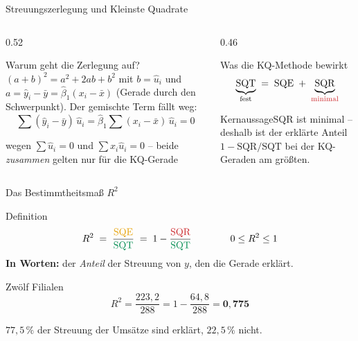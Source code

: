 \documentclass[aspectratio=169,11pt]{beamer}
\newcommand{\kernaussage}[1]{\begin{alertblock}{Kernaussage}#1\end{alertblock}}
\begin{document}
\begin{frame}{Streuungszerlegung und Kleinste Quadrate}
  \begin{columns}[T]
    \begin{column}{0.52\textwidth}
      \begin{block}{Warum geht die Zerlegung auf?}
        $(a + b)^{2} = a^{2} + 2ab + b^{2}$ mit $b = \hat{u}_i$ und
        $a = \hat{y}_i - \bar{y} = \hat{\beta}_1 (x_i - \bar{x})$
        (Gerade durch den Schwerpunkt). Der gemischte Term fällt weg:
        \[
          \sum (\hat{y}_i - \bar{y})\,\hat{u}_i
          = \hat{\beta}_1 \sum (x_i - \bar{x})\,\hat{u}_i = 0
        \]
        \vspace{-10pt}

        \footnotesize wegen $\sum \hat{u}_i = 0$ und $\sum x_i \hat{u}_i = 0$ --
        beide \emph{zusammen} gelten nur für die KQ-Gerade
      \end{block}
    \end{column}
    \begin{column}{0.46\textwidth}
      \begin{block}{Was die KQ-Methode bewirkt}
        \vspace{-6pt}
        \[
          \underbrace{\text{SQT}}_{\text{fest}}
          \;=\;
          \text{SQE}
          \;+\;
          \underbrace{\text{SQR}}_{\color{resred}\text{minimal}}
        \]
        \vspace{-8pt}
      \end{block}
      \kernaussage{SQR ist minimal -- deshalb ist der erklärte Anteil
        $1 - \text{SQR}/\text{SQT}$ bei der KQ-Geraden am größten.}
    \end{column}
  \end{columns}
\end{frame}

\begin{frame}{Das Bestimmtheitsmaß $R^{2}$}
  \begin{block}{Definition}
    \[
      R^{2}
      \;=\; \frac{\color{hsbiaccent}\text{SQE}}{\color{hsbigreen}\text{SQT}}
      \;=\; 1 - \frac{\color{resred}\text{SQR}}{\color{hsbigreen}\text{SQT}}
      \qquad\qquad 0 \le R^{2} \le 1
    \]
    \textbf{In Worten:} der \emph{Anteil} der Streuung von $y$, den die Gerade erklärt.
  \end{block}

  \medskip

  \begin{exampleblock}{Zwölf Filialen}
    \[
      R^{2} = \frac{223{,}2}{288} = 1 - \frac{64{,}8}{288} = \mathbf{0{,}775}
    \]
    \vspace{-8pt}

    $77{,}5\,\%$ der Streuung der Umsätze sind erklärt, $22{,}5\,\%$ nicht.
  \end{exampleblock}
\end{frame}
\end{document}
